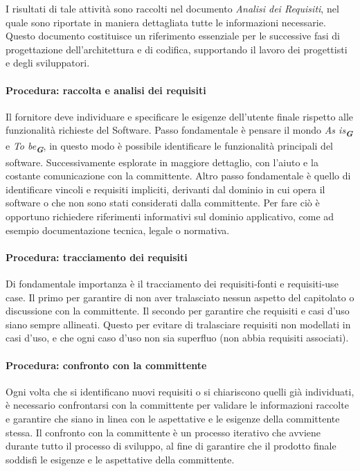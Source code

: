 \documentclass[a4paper,12pt]{article}
\newcommand{\glossario}[1]{\textit{#1}\textsubscript{\textbf{\textit{\textcolor{lightblack}{G}}}}}
\begin{document}
I risultati di tale attività sono raccolti nel documento \textit{Analisi dei
    Requisiti}, nel quale sono riportate in maniera dettagliata tutte le
informazioni necessarie. Questo documento costituisce un riferimento essenziale
per le successive fasi di progettazione dell'architettura e di codifica,
supportando il lavoro dei progettisti e degli sviluppatori.

\paragraph{Procedura: raccolta e analisi dei requisiti}
Il fornitore deve individuare e specificare le esigenze dell'utente finale
rispetto alle funzionalità richieste del Software. Passo fondamentale è pensare
il mondo \glossario{As is} e \glossario{To be}, in questo modo è possibile
identificare le funzionalità principali del software. Successivamente esplorate
in maggiore dettaglio, con l'aiuto e la costante comunicazione con la
committente. Altro passo fondamentale è quello di identificare vincoli e requisiti
impliciti, derivanti dal dominio in cui opera il software o che non sono stati
considerati dalla committente. Per fare ciò è opportuno richiedere riferimenti
informativi sul dominio applicativo, come ad esempio documentazione tecnica,
legale o normativa.

\paragraph{Procedura: tracciamento dei requisiti}
Di fondamentale importanza è il tracciamento dei requisiti-fonti e requisiti-use case.
Il primo per garantire di non aver tralasciato nessun aspetto del capitolato o discussione
con la committente. Il secondo per garantire che requisiti e casi d'uso siano sempre allineati.
Questo per evitare di tralasciare requisiti non modellati in casi d'uso, e che ogni caso d'uso non sia superfluo (non abbia requisiti associati).

\paragraph{Procedura: confronto con la committente}
Ogni volta che si identificano nuovi requisiti o si chiariscono quelli già
individuati, è necessario confrontarsi con la committente per validare le
informazioni raccolte e garantire che siano in linea con le aspettative e le
esigenze della committente stessa. Il confronto con la committente è un
processo iterativo che avviene durante tutto il processo di sviluppo, al fine
di garantire che il prodotto finale soddisfi le esigenze e le aspettative della
committente.
\end{document}
